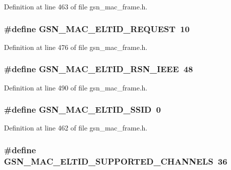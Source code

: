Definition at line 463 of file gsn\_\-mac\_\-frame.h.

\hypertarget{a00523_af0ffed09e4c3723ac65becff8b6f2bfb}{
\subsubsection[{GSN\_\-MAC\_\-ELTID\_\-REQUEST}]{\setlength{\rightskip}{0pt plus 5cm}\#define GSN\_\-MAC\_\-ELTID\_\-REQUEST~10}}
\label{a00523_af0ffed09e4c3723ac65becff8b6f2bfb}


Definition at line 476 of file gsn\_\-mac\_\-frame.h.

\hypertarget{a00523_ae13688c49759c46706b5d2c131a7337d}{
\subsubsection[{GSN\_\-MAC\_\-ELTID\_\-RSN\_\-IEEE}]{\setlength{\rightskip}{0pt plus 5cm}\#define GSN\_\-MAC\_\-ELTID\_\-RSN\_\-IEEE~48}}
\label{a00523_ae13688c49759c46706b5d2c131a7337d}


Definition at line 490 of file gsn\_\-mac\_\-frame.h.

\hypertarget{a00523_a6b416ff408a6f95dbdff53024d7b3b2b}{
\subsubsection[{GSN\_\-MAC\_\-ELTID\_\-SSID}]{\setlength{\rightskip}{0pt plus 5cm}\#define GSN\_\-MAC\_\-ELTID\_\-SSID~0}}
\label{a00523_a6b416ff408a6f95dbdff53024d7b3b2b}


Definition at line 462 of file gsn\_\-mac\_\-frame.h.

\hypertarget{a00523_ad0f340b4fb36c818e1fe1962bc3e896b}{
\subsubsection[{GSN\_\-MAC\_\-ELTID\_\-SUPPORTED\_\-CHANNELS}]{\setlength{\rightskip}{0pt plus 5cm}\#define GSN\_\-MAC\_\-ELTID\_\-SUPPORTED\_\-CHANNELS~36}}
\label{a00523_ad0f340b4fb36c818e1fe1962bc3e896b}


